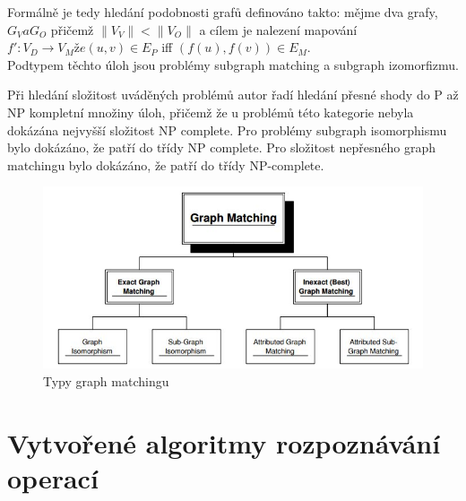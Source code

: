 \documentclass[11pt,twoside,a4paper]{book}
\begin{document}
 Formálně je tedy hledání podobnosti grafů definováno takto: mějme dva grafy,
 $G_V a G_O$ přičemž $\| V_V \| < \| V_O\|$ a cílem je nalezení mapování $f' :
 V_D \rightarrow V_M že (u, v) \in E_P$ iff $(f(u), f(v)) \in E_M$.\\
 
 Podtypem těchto úloh jsou problémy subgraph matching a subgraph izomorfizmu.
 
 Při hledání složitost uváděných problémů autor \cite{bengoetxeaPHD02} řadí
 hledání přesné shody do P až NP kompletní množiny úloh, přičemž že u problémů
 této kategorie nebyla dokázána nejvyšší složitost NP complete. Pro problémy
 subgraph isomorphismu bylo dokázáno, že patří do třídy NP complete. Pro
 složitost nepřesného graph matchingu bylo dokázáno, že patří do třídy NP-complete.
  
 \begin{figure}[H]
\begin{center}
\includegraphics[width=15cm]{figures/graph_matching.jpg}
\caption{Typy graph matchingu}
\label{fig:graph_matching}
\end{center}
\end{figure}
 
\FloatBarrier
 
 \chapter{Vytvořené algoritmy rozpoznávání
 operací}\label{chapt:recognition_implementation}
\end{document}
